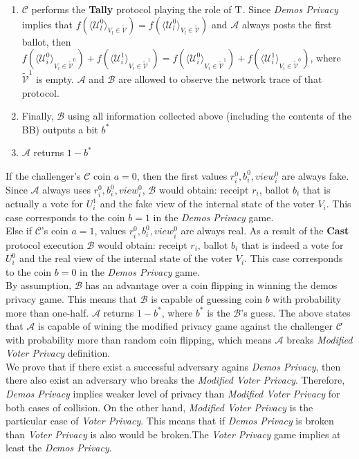 \begin{enumerate}
\begin{enumerate}
\item $\mathcal{C}$ performs the \textbf{Tally} protocol playing the role of $\operatorname{T}$. Since \textit{Demos Privacy} implies that  $f(\langle \mathcal{U}^0_l \rangle _{V_l \in \tilde{\mathcal{V}}} ) = f(\langle \mathcal{U}^0_l \rangle _{V_l \in \tilde{\mathcal{V}}})$ and  $\mathcal{A}$ always posts the first ballot, then  $f(\langle \mathcal{U}^0_i \rangle _{V_i \in \tilde{\mathcal{V}}^0} ) + f(\langle \mathcal{U}^1_i \rangle _{V_i \in \tilde{\mathcal{V}}^1} ) =  f(\langle \mathcal{U}^0_i \rangle _{V_i \in \tilde{\mathcal{V}}^1} ) +  f(\langle \mathcal{U}^1_i \rangle _{V_i \in \tilde{\mathcal{V}}^0} )$, where $\tilde{\mathcal{V}}^1$ is empty.  $\mathcal{A}$ and  $\mathcal{B}$ are allowed to observe the network trace of that protocol. 
\item Finally, $\mathcal{B}$ using all information collected above (including the contents of the BB) outputs a bit $b^*$
\item $\mathcal{A}$ returns $1 - b^*$
 \end{enumerate} 
  \end{enumerate} 
 
If the challenger's  $\mathcal{C}$ coin $a=0$, then the first values $r^0_i,b_i^0,view_i^0$ are always fake. Since $\mathcal{A}$ always uses $r^0_i,b_i^0,view_i^0$, $\mathcal{B}$ would obtain: receipt $r_i$, ballot $b_i$ that is actually a vote for $U^1_i$  and the fake view of the internal state of the voter $V_i$. This case corresponds to the coin $b=1$ in the \textit{Demos Privacy} game. \\

Else if $\mathcal{C}$'s coin $a=1$, values $r^0_i,b_i^0,view_i^0$ are always real. As a result of the \textbf{Cast}  protocol execution $\mathcal{B}$ would obtain: receipt $r_i$, ballot $b_i$ that is indeed a vote for $U^0_i$  and the real view of the internal state of the voter $V_i$. This case corresponds to the coin $b=0$ in the \textit{Demos Privacy} game.\\
 
By assumption, $\mathcal{B}$ has an advantage over a coin flipping in winning the demos privacy game. This means that  $\mathcal{B}$ is capable of guessing coin $b$ with probability more than one-half.  $\mathcal{A}$ returns $1-b^*$, where $b^*$ is the $\mathcal{B}$'s guess. The above states that $\mathcal{A}$ is capable of wining the modified privacy game against  the challenger $\mathcal{C}$ with probability more than random coin flipping, which means $\mathcal{A}$ breaks \textit{Modified Voter Privacy} definition.\\ 

We prove that if there exist a successful adversary agains \textit{Demos Privacy}, then there also exist an adversary who breaks the \textit{Modified Voter Privacy}. Therefore, \textit{Demos Privacy} implies weaker level of privacy than \textit{Modified Voter Privacy} for both cases of collision. On the other hand, \textit{Modified Voter Privacy} is the particular case of \textit{Voter Privacy}. This means that if \textit{Demos Privacy} is broken than \textit{Voter Privacy} is also would be broken.The \textit{Voter Privacy} game implies at least the \textit{Demos Privacy}.
